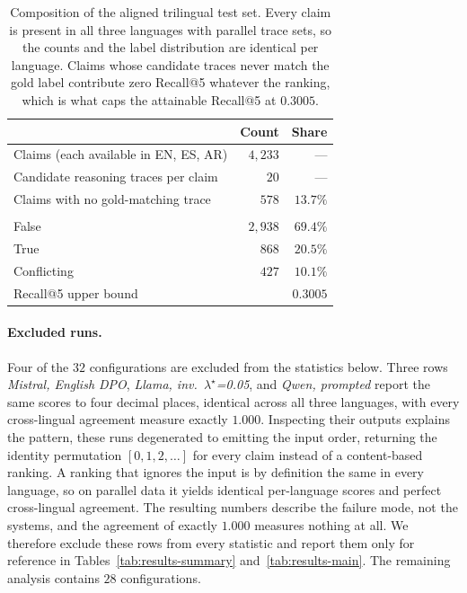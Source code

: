 \begin{table}[htbp]
\centering\small
\begin{tabular}{@{}lrr@{}}
\toprule
& Count & Share \\
\midrule
Claims (each available in EN, ES, AR) & $4{,}233$ & --- \\
Candidate reasoning traces per claim  & $20$      & --- \\
Claims with no gold-matching trace    & $578$     & $13.7\%$ \\
\addlinespace[3pt]
\multicolumn{3}{l}{\itshape Gold claim-label distribution}\\
\quad \textsf{False}                  & $2{,}938$ & $69.4\%$ \\
\quad \textsf{True}                   & $868$     & $20.5\%$ \\
\quad \textsf{Conflicting}            & $427$     & $10.1\%$ \\
\midrule
Recall@5 upper bound                  & \multicolumn{2}{r}{$0.3005$} \\
\bottomrule
\end{tabular}
\caption{Composition of the aligned trilingual test set. Every claim is present in all three
languages with parallel trace sets, so the counts and the label distribution are identical per
language. Claims whose candidate traces never match the gold label contribute zero Recall@5 whatever
the ranking, which is what caps the attainable Recall@5 at $0.3005$.}
\label{tab:dataset}
\end{table}

\paragraph{Excluded runs.}
Four of the $32$ configurations are excluded from the statistics below. Three rows \emph{Mistral,
English DPO}, \emph{Llama, inv.\ $\lambda^\star$=0.05}, and \emph{Qwen, prompted} report the same
scores to four decimal places, identical across all three languages, with every cross-lingual
agreement measure exactly $1.000$. Inspecting their outputs explains the pattern, these runs
degenerated to emitting the input order, returning the identity permutation $[0,1,2,\dots]$ for every
claim instead of a content-based ranking. A ranking that ignores the input is by definition the same
in every language, so on parallel data it yields identical per-language scores and perfect
cross-lingual agreement. The resulting numbers describe the failure mode, not the systems, and the
agreement of exactly $1.000$ measures nothing at all. We therefore exclude these rows from every
statistic and report them only for reference in Tables~\ref{tab:results-summary}
and~\ref{tab:results-main}. The remaining analysis contains $28$ configurations.

